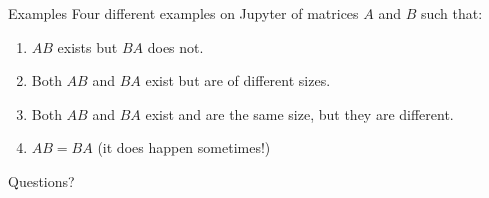 \documentclass{beamer}
\begin{document}
\begin{frame}{Examples}
  Four different examples on Jupyter of matrices $A$ and $B$ such that:\vfill
  \begin{enumerate}
  \item $AB$ exists but $BA$ does not.\vfill
  \item Both $AB$ and $BA$ exist but are of different sizes.\vfill
  \item Both $AB$ and $BA$ exist and are the same size, but they are different.\vfill
  \item $AB = BA$ (it does happen sometimes!)
  \end{enumerate}
\end{frame}

\begin{frame}
  Questions?
\end{frame}
\end{document}
